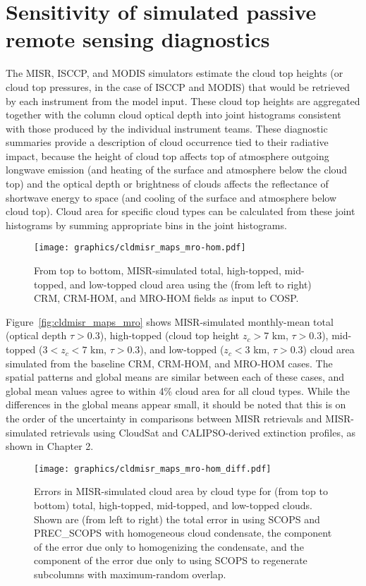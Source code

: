 \section{Sensitivity of simulated passive remote sensing
diagnostics}\label{sensitivity-of-simulated-passive-remote-sensing-diagnostics}

The MISR, ISCCP, and MODIS simulators estimate the cloud top heights (or
cloud top pressures, in the case of ISCCP and MODIS) that would be
retrieved by each instrument from the model input. These cloud top
heights are aggregated together with the column cloud optical depth into
joint histograms consistent with those produced by the individual
instrument teams. These diagnostic summaries provide a description of
cloud occurrence tied to their radiative impact, because the height of
cloud top affects top of atmosphere outgoing longwave emission (and
heating of the surface and atmosphere below the cloud top) and the
optical depth or brightness of clouds affects the reflectance of
shortwave energy to space (and cooling of the surface and atmosphere
below cloud top). Cloud area for specific cloud types can be calculated
from these joint histograms by summing appropriate bins in the joint
histograms.

\begin{figure}[tp]
\centering
\texttt{[image: graphics/cldmisr\_maps\_mro-hom.pdf]}
\caption{\label{fig:cldmisr_maps_mro}From top to bottom, MISR-simulated
total, high-topped, mid-topped, and low-topped cloud area using the
(from left to right) CRM, CRM-HOM, and MRO-HOM fields as input to
COSP.}\label{fig:cldmisrux5fmapsux5fmro}
\end{figure}

Figure~\ref{fig:cldmisr_maps_mro} shows MISR-simulated monthly-mean
total (optical depth \(\tau > 0.3\)), high-topped (cloud top height
\(z_c > 7\) km, \(\tau > 0.3\)), mid-topped (\(3 < z_c < 7\) km,
\(\tau > 0.3\)), and low-topped (\(z_c < 3\) km, \(\tau > 0.3\)) cloud
area simulated from the baseline CRM, CRM-HOM, and MRO-HOM cases. The
spatial patterns and global means are similar between each of these
cases, and global mean values agree to within 4\% cloud area for all
cloud types. While the differences in the global means appear small, it
should be noted that this is on the order of the uncertainty in
comparisons between MISR retrievals and MISR-simulated retrievals using
CloudSat and CALIPSO-derived extinction profiles, as shown in Chapter 2.

\begin{figure}[tp]
\centering
\texttt{[image: graphics/cldmisr\_maps\_mro-hom\_diff.pdf]}
\caption{\label{fig:cldmisr_maps_mro_diff}Errors in MISR-simulated cloud
area by cloud type for (from top to bottom) total, high-topped,
mid-topped, and low-topped clouds. Shown are (from left to right) the
total error in using SCOPS and PREC\_SCOPS with homogeneous cloud
condensate, the component of the error due only to homogenizing the
condensate, and the component of the error due only to using SCOPS to
regenerate subcolumns with maximum-random
overlap.}\label{fig:cldmisrux5fmapsux5fmroux5fdiff}
\end{figure}

